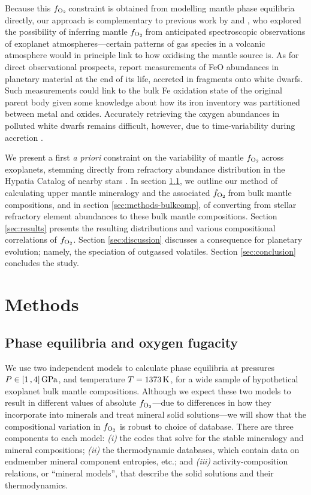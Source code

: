\documentclass[fleqn,usenatbib,twocolumn]{mnras}
\newcommand{\fo}{$f_{\ce{O2}}$}
\begin{document}
Because this \fo\,constraint is obtained from modelling mantle phase equilibria directly, our approach is complementary to previous work by \citet{ortenzi_mantle_2020} and \citet{liggins_growth_2022}, who explored the possibility of inferring mantle \fo\,from anticipated spectroscopic observations of exoplanet atmospheres---certain patterns of gas species in a volcanic atmosphere would in principle link to how oxidising the mantle source is. As for direct observational prospects, \citet{doyle_oxygen_2019, doyle_where_2020, doyle_new_2023} report measurements of FeO abundances in planetary material at the end of its life, accreted in fragments onto white dwarfs. Such measurements could link to the bulk Fe oxidation state of the original parent body given some knowledge about how its iron inventory was partitioned between metal and oxides. Accurately retrieving the oxygen abundances in polluted white dwarfs remains difficult, however, due to time-variability during accretion \citep{brouwers_asynchronous_2023}.

We present a first \textit{a priori} constraint on the variability of mantle \fo\,across exoplanets, stemming directly from refractory abundance distribution in the Hypatia Catalog of nearby stars \citep{hinkel_stellar_2014}. In section \ref{sec:methods-mineralogy}, we outline our method of calculating upper mantle mineralogy and the associated \fo\,from bulk mantle compositions, and in section \ref{sec:methods-bulkcomp}, of converting from stellar refractory element abundances to these bulk mantle compositions. Section \ref{sec:results} presents the resulting distributions and various compositional correlations of \fo. Section \ref{sec:discussion} discusses a consequence for planetary evolution; namely, the speciation of outgassed volatiles. Section \ref{sec:conclusion} concludes the study.


\section{Methods}



\subsection{Phase equilibria and oxygen fugacity}\label{sec:methods-mineralogy}

We use two independent models to calculate phase equilibria at pressures $P \in [1\,,4]\,{\rm GPa}$, and temperature $T = 1373\,{\rm K}$, for a wide sample of hypothetical exoplanet bulk mantle compositions. Although we expect these two models to result in different values of absolute $f_{\ce{O2}}$---due to differences in how they incorporate  into minerals and treat mineral solid solutions---we will show that the compositional variation in $f_{\ce{O2}}$ is robust to choice of database. There are three components to each model: \textit{(i)} the codes that solve for the stable mineralogy and mineral compositions; \textit{(ii)} the thermodynamic databases, which contain data on endmember mineral component entropies, etc.; and \textit{(iii)} activity-composition relations, or ``mineral models'', that describe the solid solutions and their thermodynamics. 
\end{document}
